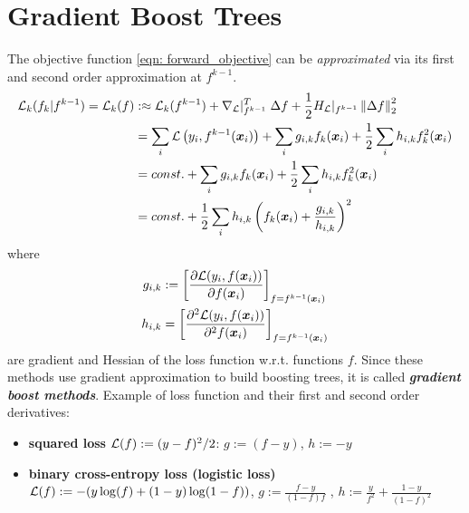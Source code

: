 \documentclass[11pt]{article}
\begin{document}
\section{Gradient Boost Trees}
The objective function \eqref{eqn: forward_objective} can be \emph{approximated} via its first and second order approximation at $f^{k-1}$. 
\begin{align}
{\mathcal L}_{k}(f_{k} | f^{k-1}) = {\mathcal L}_{k}(f) &:\approx  {\mathcal L}_{k}(f^{k-1}) + \nabla_{{\mathcal L}}|_{f^{k-1}}^{T}\;\Delta f + \frac{1}{2}H_{{\mathcal L}}|_{f^{k-1}} \left\|\Delta f\right\|_{2}^2  \nonumber\\
&=   \sum_{i}{\mathcal L}\left(y_i, f^{k-1}(\boldsymbol{x}_{i})\right) + \sum_{i}g_{i,k} f_{k}(\boldsymbol{x}_{i}) + \frac{1}{2}\sum_{i}h_{i,k} f_{k}^2(\boldsymbol{x}_{i}) \nonumber\\
&= const. +  \sum_{i}g_{i,k} f_{k}(\boldsymbol{x}_{i}) + \frac{1}{2}\sum_{i}h_{i,k} f_{k}^2(\boldsymbol{x}_{i}) \label{eqn: forward_objective_grad} \\
&= const. + \frac{1}{2} \sum_{i}h_{i,k}\left(f_{k}(\boldsymbol{x}_{i}) + \frac{g_{i,k}}{h_{i,k}}\right)^{2} \label{eqn: forward_objective_grad_weight}
\end{align} where 
\begin{align*}
g_{i,k} &:= \left[\frac{\partial {\mathcal L}(y_i, f(\boldsymbol{x}_{i}))}{\partial f(\boldsymbol{x}_{i})}\right]_{f=f^{k-1}(\boldsymbol{x}_{i})} \\
h_{i,k} &=  \left[\frac{\partial^2 {\mathcal L}(y_i, f(\boldsymbol{x}_{i}))}{\partial^{2} f(\boldsymbol{x}_{i})}\right]_{f=f^{k-1}(\boldsymbol{x}_{i})}
\end{align*} are gradient and Hessian of the loss function w.r.t. functions $f$. Since these methods use gradient approximation to build boosting trees, it is called \emph{\textbf{gradient boost methods}}. Example of loss function and their first and second order derivatives:
\begin{itemize}
\item \textbf{squared loss} ${\mathcal L}(f) := (y-f)^2 /2$: $g:= (f-y)$, $h := -y$
\item  \textbf{binary cross-entropy loss (logistic loss)} ${\mathcal L}(f) :=-( y\log(f) + (1-y)\log(1-f))$, $g:= \frac{f-y}{(1- f)f}$ , $h :=\frac{y}{f^2} + \frac{1-y}{(1-f)^2}$
\end{itemize}
\end{document}
